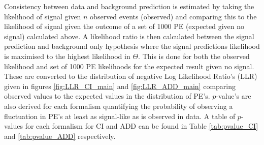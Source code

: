     Consistency between data and background prediction is estimated by taking the likelihood of signal given $n$ observed events (observed) and comparing this to the likelihood of signal given the outcome of a set of 1000 PE (expected given no signal) calculated above. A likelihood ratio is then calculated between the signal prediction and background only hypothesis where the signal predictions likelihood is maximised to the highest likelihood in $\Theta$. This is done for both the observed likelihood and set of 1000 PE likelihoods for the expected result given no signal. These are converted to the distribution of negative Log Likelihood Ratio's (LLR) given in figures \ref{fig:LLR_CI_main} and \ref{fig:LLR_ADD_main} comparing observed values to the expected values in the distribution of PE's. $p$-value's are also derived for each formalism quantifying the probability of observing a fluctuation in PE's at least as signal-like as is observed in data. A table of $p$-values for each formalism for CI and ADD can be found in Table \ref{tab:pvalue_CI} and \ref{tab:pvalue_ADD} respectively. 



